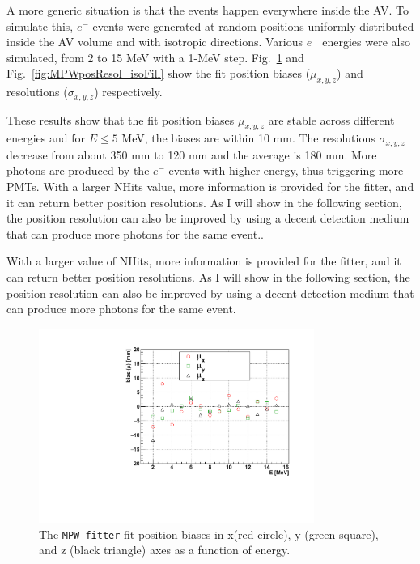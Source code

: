 A more generic situation is that the events happen everywhere inside the AV. To simulate this, $e^-$ events were generated at random positions uniformly distributed inside the AV volume and with isotropic directions. Various $e^-$ energies were also simulated, from 2 to 15 MeV with a 1-MeV step. Fig.~\ref{fig:MPWposBias_isoFill} and Fig.~\ref{fig:MPWposResol_isoFill} show the fit position biases ($\mu_{x,y,z}$) and resolutions ($\sigma_{x,y,z}$) respectively. 

These results show that the fit position biases $\mu_{x,y,z}$ are stable across different energies and for $E\leq 5$ MeV, the biases are within 10 mm.
The resolutions $\sigma_{x,y,z}$ decrease from about 350 mm to 120 mm and the average is 180 mm. More photons are produced by the $e^-$ events with higher energy, thus triggering more PMTs. With a larger NHits value, more information is provided for the fitter, and it can return better position resolutions. As I will show in the following section, the position resolution can also be improved by using a decent detection medium that can produce more photons for the same event.. 

With a larger value of NHits, more information is provided for the fitter, and it can return better position resolutions. As I will show in the following section, the position resolution can also be improved by using a decent detection medium that can produce more photons for the same event. 

\begin{figure}[htbp]
	\centering	
	\includegraphics[width=9cm]{MPW_isoFill_posBiasVsE.pdf}
	\caption[The \texttt{MPW fitter} fit position biases ($\mu_{x,y,z}$) as a function of energy.]{The \texttt{MPW fitter} fit position biases in x(red circle), y (green square), and z (black triangle) axes as a function of energy.}
	\label{fig:MPWposBias_isoFill}
\end{figure}

